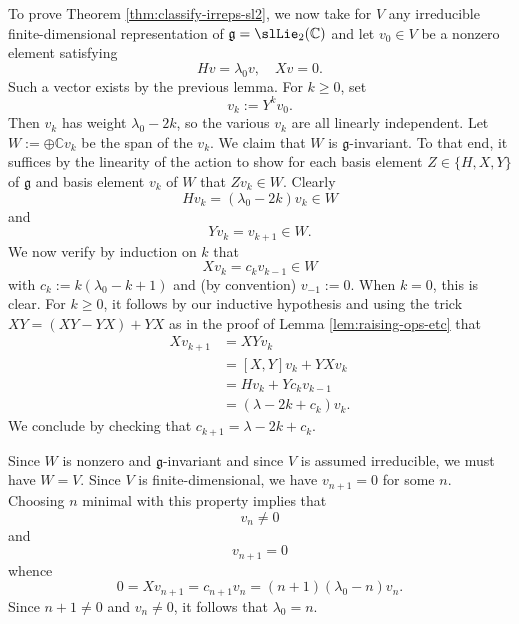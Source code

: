 \documentclass[reqno]{amsart} 
\begin{document}
To prove Theorem \ref{thm:classify-irreps-sl2},
we now take for $V$ any irreducible finite-dimensional
representation
of $\mathfrak{g} = \slLie_2(\mathbb{C})$
and let $v_0 \in V$ be a nonzero element
satisfying
\begin{equation*}
  H v = \lambda_0 v,
  \quad X v = 0.
\end{equation*}
Such a vector exists by the previous lemma.
For $k \geq 0$,
set
\begin{equation*}
  v_k := Y^k v_0.
\end{equation*}
Then $v_k$ has weight $\lambda_0 - 2k$,
so the various $v_k$ are all linearly independent.
Let $W := \oplus \mathbb{C} v_k$ be the span of the $v_k$.
We claim that $W$ is $\mathfrak{g}$-invariant.
To that end, it suffices by the linearity
of the action to show
for each basis element $Z \in \{H,X,Y\}$ of $\mathfrak{g}$
and basis element $v_k$ of $W$
that $Z v_k \in W$.
Clearly
\begin{equation*}
  H v_k = (\lambda_0 - 2 k) v_k \in W
\end{equation*}
and
\begin{equation*}
  Y v_k = v_{k+1} \in W.
\end{equation*}
We now verify by induction on $k$ that
\begin{equation*}
  X v_k = c_k v_{k-1} \in W
\end{equation*}
with $c_k := k(\lambda_0 - k + 1)$
and (by convention) $v_{-1} := 0$.
When $k = 0$, this is clear.
For $k \geq 0$,
it follows by our inductive hypothesis
and using the trick $X Y = (X Y - Y X) + Y X$
as in  the proof of Lemma \ref{lem:raising-ops-etc}
that
\begin{align*}
  X v_{k+1}
  &=
    X Y v_k
  \\
  &=
    {}    [X,Y] v_k + Y X v_k
  \\
  &=
    H v_k + Y c_k v_{k-1}
  \\
  &= (\lambda - 2k + c_k) v_k.
\end{align*}
We conclude by
checking that $c_{k+1} =\lambda - 2k + c_k$.

Since $W$ is nonzero and $\mathfrak{g}$-invariant
and since $V$ is assumed irreducible,
we must have $W = V$.
Since $V$ is finite-dimensional,
we have $v_{n+1} = 0$ for some $n$.
Choosing $n$ minimal with this property
implies that
\begin{equation*}
  v_n \neq 0
\end{equation*}
and
\begin{equation*}
  v_{n+1} = 0
\end{equation*}
whence
\begin{equation*}
  0 = X v_{n+1}
  = c_{n+1} v_n
  = (n+1)(\lambda_0 - n) v_n.
\end{equation*}
Since $n+1 \neq 0$ and $v_n \neq 0$,
it follows that $\lambda_0 = n$.
\end{document}
